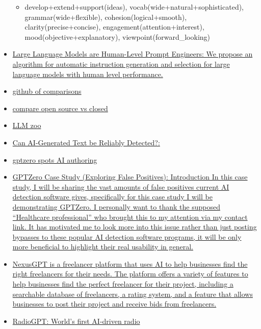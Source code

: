 \begin{itemize}
\begin{itemize}
  \item
    develop+extend+support(ideas), vocab(wide+natural+sophisticated),
    grammar(wide+flexible), cohesion(logical+smooth),
    clarity(precise+concise), engagement(attention+interest),
    mood(objective+explanatory), viewpoint(forward\_looking)
  \end{itemize}
\item
  \href{https://openreview.net/forum?id=92gvk82DE-}{Large Language
  Models are Human-Level Prompt Engineers: We propose an algorithm for
  automatic instruction generation and selection for large language
  models with human level performance.}
\item
  \href{https://georgesung.github.io/ai/llm-qa-eval-wikipedia/}{github
  of comparisons}
\item
  \href{https://georgesung.github.io/ai/llm-qa-eval-wikipedia/}{compare
  open source vs closed}
\item
  \href{https://github.com/FreedomIntelligence/LLMZoo}{LLM zoo}
\item
  \href{https://arxiv.org/abs/2303.11156}{Can AI-Generated Text be
  Reliably Detected?:}
\item
  \href{http://gptzero.me/}{gptzero spots AI authoring}
\item
  \href{https://gonzoknows.com/posts/GPTZero-Case-Study/}{GPTZero Case
  Study (Exploring False Positives): Introduction In this case study, I
  will be sharing the vast amounts of false positives current AI
  detection software gives, specifically for this case study I will be
  demonstrating GPTZero. I personally want to thank the supposed
  ``Healthcare professional'' who brought this to my attention via my
  contact link. It has motivated me to look more into this issue rather
  than just posting bypasses to these popular AI detection software
  programs, it will be only more beneficial to highlight their real
  usability in general.}
\item
  \href{https://nexus.snikpic.io}{NexusGPT is a freelancer platform that
  uses AI to help businesses find the right freelancers for their needs.
  The platform offers a variety of features to help businesses find the
  perfect freelancer for their project, including a searchable database
  of freelancers, a rating system, and a feature that allows businesses
  to post their project and receive bids from freelancers.}
\item
  \href{https://interestingengineering.com/innovation/radiogpt-worlds-first-ai-radio-station}{RadioGPT:
  \textquotesingle World's first\textquotesingle{} AI-driven radio
}
\end{itemize}
